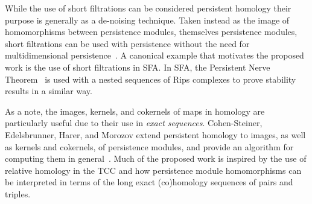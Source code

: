 While the use of short filtrations can be considered persistent homology their purpose is generally as a de-noising technique.
Taken instead as the image of homomorphisms between persistence modules, themselves persistence modules, short filtrations can be used with persistence without the need for multidimensional persistence~\cite{todo}.
A canonical example that motivates the proposed work is the use of short filtrations in SFA.
In SFA, the Persistent Nerve Theorem~\cite{chazal08towards} is used with a nested sequences of Rips complexes to prove stability results in a similar way.

As a note, the images, kernels, and cokernels of maps in homology are particularly useful due to their use in \emph{exact sequences}.
Cohen-Steiner, Edelsbrunner, Harer, and Morozov extend persistent homology to images, as well as kernels and cokernels, of persistence modules, and provide an algorithm for computing them in general~\cite{cohen09persistent}.
Much of the proposed work is inspired by the use of relative homology in the TCC and how persistence module homomorphisms can be interpreted in terms of the long exact (co)homology sequences of pairs and triples.



